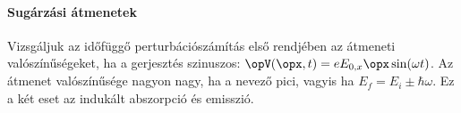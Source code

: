    \paragraph{Sugárzási átmenetek}
    
    Vizsgáljuk az időfüggő perturbációszámítás első rendjében az átmeneti valószínűségeket, ha a gerjesztés szinuszos: $\opV(\opx,t)=e E_{0,x} \opx \sin(\omega t)$. 
    Az átmenet valószínűsége nagyon nagy, ha a nevező pici, vagyis ha $E_f=E_i\pm\hbar\omega$.
   Ez a két eset az indukált abszorpció és emisszió.
